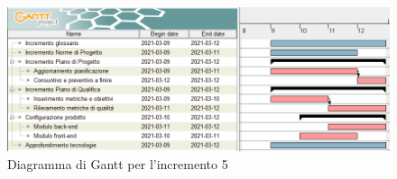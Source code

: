 \begin{figure}[H]
\centering

\centerline{\includegraphics[scale=0.6]{res/Pianificazione/Fasi/CodificaIncrementi/ganttIncremento5}}
\caption{Diagramma di Gantt per l'incremento 5}
\end{figure}

